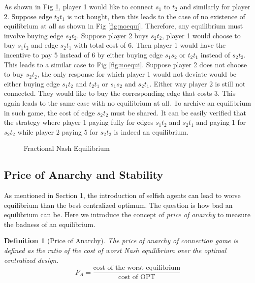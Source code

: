 \documentclass[11pt,psfig,times]{article}
\newtheorem{definition}{Definition}[section]
\begin{document}
As shown in Fig \ref{fig:fracquil}, player 1 would like to connect $s_1$ to $t_2$ and similarly for player 2. Suppose edge $t_2t_1$ is not bought, then this leads to the case of no existence of equilibrium at all as shown in Fig \ref{fig:noequi}. Therefore, any equilibrium must involve buying edge $s_2t_2$. Suppose player 2 buys $s_2t_2$, player 1 would choose to buy $s_1t_2$ and edge $s_2t_1$ with total cost of 6. Then player 1 would have the incentive to pay 5 instead of 6 by either buying edge $s_1s_2$ or $t_2t_1$ instead of $s_2t_2$. This leads to a similar case to Fig \ref{fig:noequi}. Suppose player 2 does not choose to buy $s_2t_2$, the only response for which player 1 would not deviate would be either buying edge $s_1t_2$ and $t_2t_1$ or $s_1s_2$ and $s_2t_1$. Either way player 2 is still not connected. They would like to buy the corresponding edge that costs 3. This again leads to the same case with no equilibrium at all. To archive an equilibrium in such game, the cost of edge $s_2t_2$ must be shared. It can be easily verified that the strategy where player 1 paying fully for edges $s_1t_2$ and $s_2t_1$ and paying 1 for $s_2t_2$ while player 2 paying 5 for $s_2t_2$ is indeed an equilibrium.
\begin{figure}[H]
\begin{center}
\end{center}
\caption{Fractional Nash Equilibrium}
\label{fig:fracquil}
\end{figure}


\subsection{Price of Anarchy and Stability}
As mentioned in Section 1, the introduction of selfish agents can lead to worse equilibrium than the best centralized optimum. The question is how bad an equilibrium can be. Here we introduce the concept of \textit{price of anarchy} to measure the badness of an equilibrium.
\begin{definition}[Price of Anarchy] The price of anarchy of connection game is defined as the ratio of the cost of worst Nash equilibrium over the optimal centralized design.
	\[P_A = \dfrac{\text{cost of the worst equilibrium} }{\text{cost of OPT}}\]
\end{definition}
\end{document}
